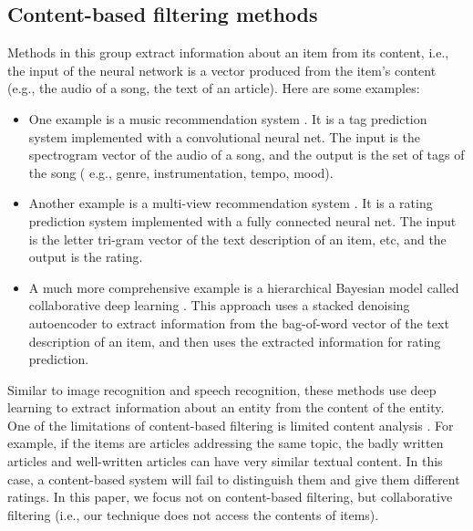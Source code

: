 \documentclass[sigconf]{acmart}
\begin{document}
\subsection{Content-based filtering methods}
Methods in this group extract information about an item from its content, 
i.e., the input of the neural network is a vector produced from the item's 
content (e.g., the audio of a song, the text of an article). Here are some 
examples:
\begin{itemize}
	\item One example is a music recommendation system 	\cite{van2013deep}. 
	It is a tag prediction system implemented with a convolutional neural net. 
	The input is the spectrogram vector of the audio of a song,
	and the output 	is the set of tags of the song (
	e.g., genre, instrumentation, tempo, mood).
	\item Another example is a multi-view recommendation system 	
	\cite{elkahky2015multi}. 
	It is a rating prediction system implemented with a fully connected 
	neural net.
	The input is the letter tri-gram vector of the text description of an item, 
	etc, and the output is the rating.
	\item A much more comprehensive example is a hierarchical Bayesian model 
	called collaborative deep learning \cite{wang2015collaborative}.
	This approach uses a stacked denoising autoencoder to extract information 
	from the bag-of-word vector of the text description of an item,
	and then uses the extracted information for rating prediction.
\end{itemize}
Similar to image recognition and speech recognition, these methods use deep 
learning to extract information about an entity from the content of the entity.
One of the limitations of content-based filtering is limited content analysis 
\cite{adomavicius2005toward}.
For example, if the items are articles addressing the same topic,
the badly written articles and well-written articles can have very similar 
textual content. In this case, a content-based system will fail to distinguish 
them and give them different ratings.
In this paper, we focus not on content-based filtering, but collaborative 
filtering (i.e., our technique does not access the contents of items).
\end{document}
